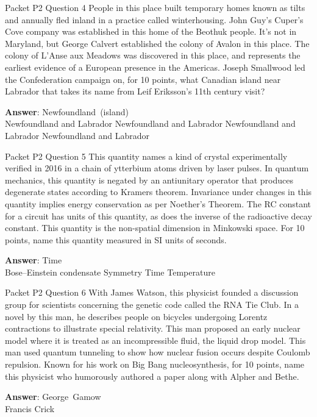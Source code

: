 \begin{frame}{Packet P2 Question 4}
People in this place built temporary homes known as tilts and annually fled inland in a practice called winterhousing. John Guy’s Cuper's Cove company was established in this home of the Beothuk people. It’s not in Maryland, but George Calvert established the colony of Avalon in this place. The colony of L'Anse aux Meadows was discovered in this place, and represents the earliest evidence of a European presence in the Americas. Joseph Smallwood led the Confederation   campaign on, for 10 points, what Canadian island near   Labrador that takes   its name from Leif Eriksson's 11th century   visit?

\textbf{Answer}: Newfoundland\ (island)\\
 Newfoundland and Labrador
 Newfoundland and Labrador
 Newfoundland and Labrador
 Newfoundland and Labrador
\end{frame}

\begin{frame}{Packet P2 Question 5}
This quantity names a kind of crystal experimentally verified in 2016 in a chain of ytterbium atoms driven by laser pulses. In quantum mechanics,   this quantity is negated by an antiunitary operator that produces degenerate states according to Kramers theorem. Invariance under changes in this quantity   implies energy conservation as per Noether’s Theorem. The RC constant for a circuit has units of this quantity, as does the inverse of the radioactive decay constant. This quantity is the non-spatial dimension in Minkowski space. For 10 points, name this quantity measured in SI units of seconds.    

\textbf{Answer}: Time\\
 Bose–Einstein condensate
 Symmetry
 Time
 Temperature
\end{frame}

\begin{frame}{Packet P2 Question 6}
With James Watson, this physicist founded   a discussion group for scientists concerning the genetic code called the RNA Tie Club. In a novel by this man, he describes people on bicycles undergoing Lorentz contractions to illustrate special relativity. This man proposed an early nuclear model where it is treated as an incompressible fluid, the liquid drop model. This man used quantum tunneling to show   how nuclear fusion occurs despite Coulomb repulsion. Known   for his work on Big Bang nucleosynthesis, for 10 points, name   this physicist who humorously authored a paper along with   Alpher and Bethe.

\textbf{Answer}: George\ Gamow\\
 Francis Crick
\end{frame}

